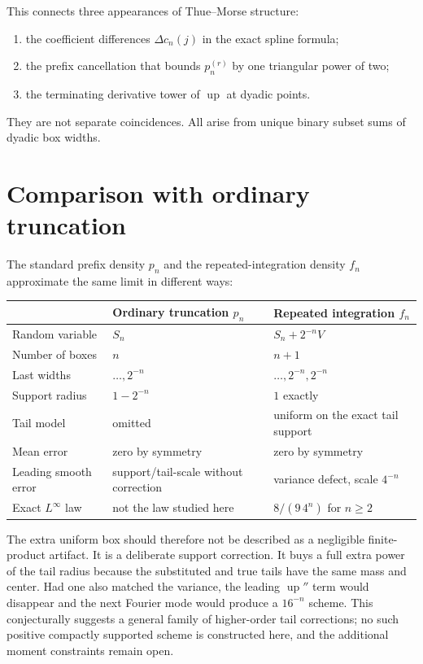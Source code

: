 \documentclass[11pt,oneside]{article}
\theoremstyle{definition}
\theoremstyle{remark}
\newcommand{\Up}{\operatorname{up}}
\begin{document}
This connects three appearances of Thue--Morse structure:
\begin{enumerate}
\item the coefficient differences $\Delta c_n(j)$ in the exact spline formula;
\item the prefix cancellation that bounds $p_n^{(r)}$ by one triangular power of two;
\item the terminating derivative tower of $\Up$ at dyadic points.
\end{enumerate}
They are not separate coincidences.  All arise from unique binary subset sums of dyadic box
widths.

\section{Comparison with ordinary truncation}
\label{repeated:sec:comparison}

The standard prefix density $p_n$ and the repeated-integration density $f_n$ approximate the
same limit in different ways:
\begin{center}
\begin{tabularx}{0.96\textwidth}{@{}p{}XX@{}}
\toprule
 & Ordinary truncation $p_n$ & Repeated integration $f_n$\\
\midrule
Random variable & $S_n$ & $S_n+2^{-n}V$\\
Number of boxes & $n$ & $n+1$\\
Last widths & $\ldots,2^{-n}$ & $\ldots,2^{-n},2^{-n}$\\
Support radius & $1-2^{-n}$ & $1$ exactly\\
Tail model & omitted & uniform on the exact tail support\\
Mean error & zero by symmetry & zero by symmetry\\
Leading smooth error & support/tail-scale without correction & variance defect, scale $4^{-n}$\\
Exact $L^\infty$ law & not the law studied here & $8/(9\,4^n)$ for $n\ge2$\\
\bottomrule
\end{tabularx}
\end{center}

The extra uniform box should therefore not be described as a negligible finite-product
artifact.  It is a deliberate support correction.  It buys a full extra power of the tail
radius because the substituted and true tails have the same mass and center.  Had one also
matched the variance, the leading $\Up''$ term would disappear and the next Fourier mode would
produce a $16^{-n}$ scheme.  This conjecturally suggests a general family of
higher-order tail corrections; no such positive compactly supported scheme is
constructed here, and the additional moment constraints remain open.
\end{document}

